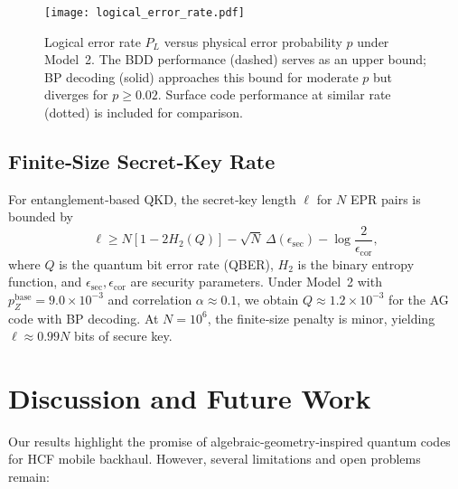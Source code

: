 \documentclass[conference]{IEEEtran}
\begin{document}
    \begin{figure}[t]
    \centering
    \texttt{[image: logical\_error\_rate.pdf]}
    \caption{Logical error rate $P_L$ versus physical error probability $p$ under Model 2.  The BDD performance (dashed)
  serves as an upper bound; BP decoding (solid) approaches this bound for moderate $p$ but diverges for $p\ge0.02$.  
Surface code performance at similar rate (dotted) is included for comparison.}
    \label{fig:ber}
    \end{figure}

    \subsection{Finite‑Size Secret‑Key Rate}
    For entanglement‑based QKD, the secret‑key length $\ell$ for $N$ EPR pairs is bounded by
    \begin{equation}
    \ell \ge N[1-2H_2(Q)]-\sqrt{N}\,\Delta(\epsilon_{\mathrm{sec}}) - \log \frac{2}{\epsilon_{\mathrm{cor}}},
    \end{equation}
    where $Q$ is the quantum bit error rate (QBER), $H_2$ is the binary entropy function, and $\epsilon_{\mathrm{sec}}, 
\epsilon_{\mathrm{cor}}$ are security parameters.  Under Model 2 with $p_Z^{\mathrm{base}}=9.0\times 10^{-3}$ and 
correlation $\alpha\approx 0.1$, we obtain $Q\approx 1.2\times 10^{-3}$ for the AG code with BP decoding.  At $N=10^6$, 
the finite‑size penalty is minor, yielding $\ell\approx 0.99N$ bits of secure key.

    \section{Discussion and Future Work}

    Our results highlight the promise of algebraic‑geometry‑inspired quantum codes for HCF mobile backhaul.  However, 
several limitations and open problems remain:
\end{document}

